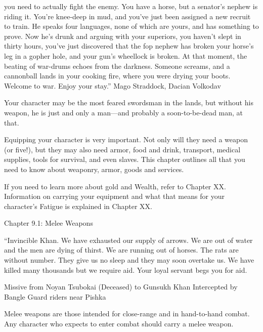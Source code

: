 \documentclass[oneside,11pt,english]{book}
\begin{document}
you need to actually fight the enemy. You have a horse, but a senator’s nephew is riding it. You’re knee-deep in mud, and you’ve 
just been assigned a new recruit to train. He speaks four languages, none of which are yours, and has something to prove. Now 
he’s drunk and arguing with your superiors, you haven’t slept in thirty hours, you’ve just discovered that the fop nephew has 
broken your horse’s leg in a gopher hole, and your gun’s wheellock is broken. At that moment, the beating of war-drums echoes 
from the darkness. Someone screams, and a cannonball lands in your cooking fire, where you were drying your boots. 
Welcome to war. Enjoy your stay.” 
Mago Straddock, Dacian Volkodav 
 
Your character may be the most feared swordsman in the lands, but without his weapon, he is just and 
only a man—and probably a soon-to-be-dead man, at that. 

 

Equipping your character is very important. Not only will they need a weapon (or five!), but they may 
also need armor, food and drink, transport, medical supplies, tools for survival, and even slaves. This 
chapter outlines all that you need to know about weaponry, armor, goods and services. 

 

If you need to learn more about gold and Wealth, refer to Chapter XX. Information on carrying your 
equipment and what that means for your character’s Fatigue is explained in Chapter XX. 

 

Chapter 9.1: Melee Weapons 

 

“Invincible Khan. We have exhausted our supply of arrows. We are out of water and the men are dying of 
thirst. We are running out of horses. The rats are without number. They give us no sleep and they may 
soon overtake us. We have killed many thousands but we require aid. Your loyal servant begs you for aid. 

 

Missive from Noyan Tsubokai (Deceased) to Gunsukh Khan 
Intercepted by Bangle Guard riders near Pishka 

 

 

Melee weapons are those intended for close-range and in hand-to-hand combat. Any character who 
expects to enter combat should carry a melee weapon. 

 
\end{document}
